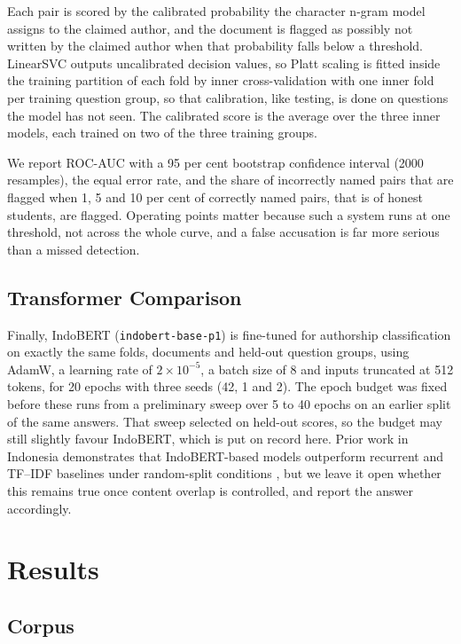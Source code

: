 \documentclass[runningheads]{llncs}
\begin{document}
Each pair is scored by the calibrated probability the character n-gram model assigns to the claimed author, and the document is flagged as possibly not written by the claimed author when that probability falls below a threshold. LinearSVC outputs uncalibrated decision values, so Platt scaling is fitted inside the training partition of each fold by inner cross-validation with one inner fold per training question group, so that calibration, like testing, is done on questions the model has not seen. The calibrated score is the average over the three inner models, each trained on two of the three training groups.

We report ROC-AUC with a 95 per cent bootstrap confidence interval (2000 resamples), the equal error rate, and the share of incorrectly named pairs that are flagged when 1, 5 and 10 per cent of correctly named pairs, that is of honest students, are flagged. Operating points matter because such a system runs at one threshold, not across the whole curve, and a false accusation is far more serious than a missed detection.

\subsection{Transformer Comparison}

Finally, IndoBERT (\texttt{indobert-base-p1}) is fine-tuned for authorship classification on exactly the same folds, documents and held-out question groups, using AdamW, a learning rate of $2 \times 10^{-5}$, a batch size of 8 and inputs truncated at 512 tokens, for 20 epochs with three seeds (42, 1 and 2). The epoch budget was fixed before these runs from a preliminary sweep over 5 to 40 epochs on an earlier split of the same answers. That sweep selected on held-out scores, so the budget may still slightly favour IndoBERT, which is put on record here. Prior work in Indonesia demonstrates that IndoBERT-based models outperform recurrent and TF--IDF baselines under random-split conditions \cite{Saputra2023,Saputra2024}, but we leave it open whether this remains true once content overlap is controlled, and report the answer accordingly.

\section{Results}

\subsection{Corpus}
\end{document}
